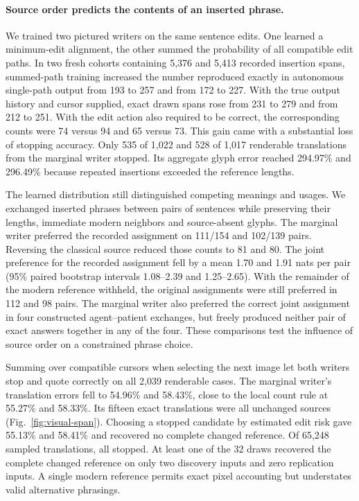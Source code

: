 \paragraph{Source order predicts the contents of an inserted phrase.}
We trained two pictured writers on the same sentence edits. One learned a minimum-edit alignment, the other summed the probability of all compatible edit paths. In two fresh cohorts containing 5,376 and 5,413 recorded insertion spans, summed-path training increased the number reproduced exactly in autonomous single-path output from 193 to 257 and from 172 to 227. With the true output history and cursor supplied, exact drawn spans rose from 231 to 279 and from 212 to 251. With the edit action also required to be correct, the corresponding counts were 74 versus 94 and 65 versus 73. This gain came with a substantial loss of stopping accuracy. Only 535 of 1,022 and 528 of 1,017 renderable translations from the marginal writer stopped. Its aggregate glyph error reached 294.97\% and 296.49\% because repeated insertions exceeded the reference lengths.

The learned distribution still distinguished competing meanings and usages. We exchanged inserted phrases between pairs of sentences while preserving their lengths, immediate modern neighbors and source-absent glyphs. The marginal writer preferred the recorded assignment on 111/154 and 102/139 pairs. Reversing the classical source reduced those counts to 81 and 80. The joint preference for the recorded assignment fell by a mean 1.70 and 1.91 nats per pair (95\% paired bootstrap intervals 1.08--2.39 and 1.25--2.65). With the remainder of the modern reference withheld, the original assignments were still preferred in 112 and 98 pairs. The marginal writer also preferred the correct joint assignment in four constructed agent--patient exchanges, but freely produced neither pair of exact answers together in any of the four. These comparisons test the influence of source order on a constrained phrase choice.

Summing over compatible cursors when selecting the next image let both writers stop and quote correctly on all 2,039 renderable cases. The marginal writer's translation errors fell to 54.96\% and 58.43\%, close to the local count rule at 55.27\% and 58.33\%. Its fifteen exact translations were all unchanged sources (Fig.~\ref{fig:visual-span}). Choosing a stopped candidate by estimated edit risk gave 55.13\% and 58.41\% and recovered no complete changed reference. Of 65,248 sampled translations, all stopped. At least one of the 32 draws recovered the complete changed reference on only two discovery inputs and zero replication inputs. A single modern reference permits exact pixel accounting but understates valid alternative phrasings.
